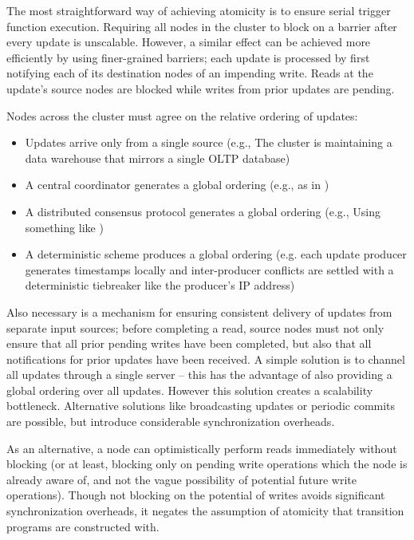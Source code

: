 The most straightforward way of achieving atomicity is to ensure serial trigger
function execution.  Requiring all nodes in the cluster to block on a barrier
after every update is unscalable.  However, a similar effect can be achieved
more efficiently by using finer-grained barriers; each update is processed by
first notifying each of its destination nodes of an impending write.  Reads at
the update's source nodes are blocked while writes from prior updates are
pending.

Nodes across the cluster must agree on the relative ordering of updates:
\begin{itemize}
\item Updates arrive only from a single source (e.g., The cluster is maintaining
a data warehouse that mirrors a single OLTP database)
\item A central coordinator generates a global ordering (e.g., as in
\cite{peng-incremental:10})
\item A distributed consensus protocol generates a global ordering (e.g., Using
something like \cite{Junqueira:2009:LTZ:1582716.1582721})
\item A deterministic scheme produces a global ordering (e.g. each update
producer generates timestamps locally and inter-producer conflicts are settled
with a deterministic tiebreaker like the producer's IP address)
\end{itemize}

Also necessary is a mechanism for ensuring consistent delivery of updates from
separate input sources; before completing a read, source nodes must not only
ensure that all prior pending writes have been completed, but also that all
notifications for prior updates have been received.  A simple solution is to
channel all updates through a single server -- this has the advantage of also
providing a global ordering over all updates.  However this solution creates a
scalability bottleneck.  Alternative solutions like broadcasting updates or
periodic commits are possible, but introduce considerable synchronization
overheads.

As an alternative, a node can optimistically perform reads immediately without
blocking (or at least, blocking only on pending write operations which the node
is already aware of, and not the vague possibility of potential future write
operations).  Though not blocking on the potential of writes avoids significant
synchronization overheads, it negates the assumption of atomicity that
transition programs are constructed with.

